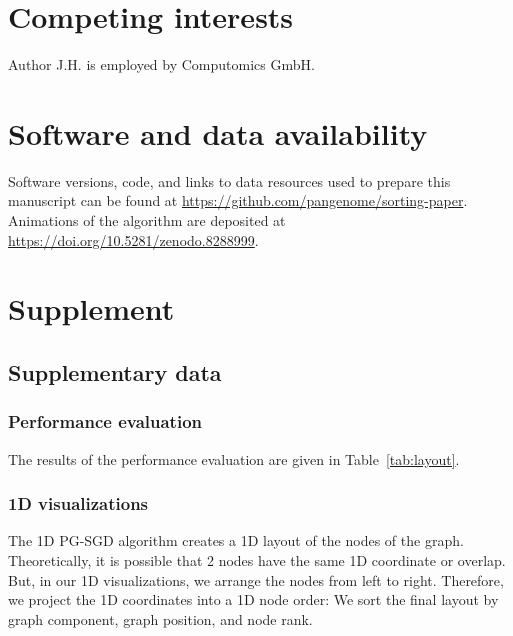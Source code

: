 \documentclass{bioinfo}
\theoremstyle{definition}
\newcommand{\red}[1]{{\textcolor{Red}{#1}}}
\newcommand{\FIXME}[1]{\red{[FIXME: #1]}}
\newcommand{\beginsupplement}{%
	\setcounter{table}{0}
	\renewcommand{\thetable}{S\arabic{table}}%
	\setcounter{figure}{0}
	\renewcommand{\thefigure}{S\arabic{figure}}%
}
\begin{document}
	\section*{Competing interests}
	Author J.H. is employed by Computomics GmbH.
	
	\section*{Software and data availability}
	
	Software versions, code, and links to data resources used to prepare this manuscript can be found at \url{https://github.com/pangenome/sorting-paper}.
	Animations of the algorithm are deposited at \url{https://doi.org/10.5281/zenodo.8288999}.
		
	
	
	
	
	\clearpage
	\setcounter{page}{1}
	
	\beginsupplement
	
	\section{Supplement}
	
	 \subsection{Supplementary data}
	 \subsubsection{Performance evaluation}
	 \label{sec:performance}
	 The results of the performance evaluation are given in Table~\ref{tab:layout}.
	 
	\subsubsection{1D visualizations}	
	The 1D PG-SGD algorithm creates a 1D layout of the nodes of the graph.
	Theoretically, it is possible that 2 nodes have the same 1D coordinate or overlap.
	But, in our 1D visualizations, we arrange the nodes from left to right.
	Therefore, we project the 1D coordinates into a 1D node order: We sort the final layout by graph component, graph position, and node rank.
	
\end{document}
